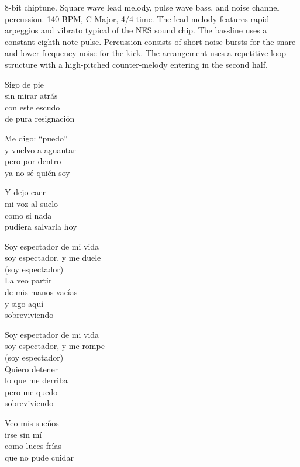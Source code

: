 

\begin{notes}
\end{notes}
\begin{style}
8-bit chiptune. %
Square wave lead melody, pulse wave bass, and noise channel percussion. %
140 BPM, C Major, 4/4 time. %
The lead melody features rapid arpeggios and vibrato typical of the NES sound chip. %
The bassline uses a constant eighth-note pulse. %
Percussion consists of short noise bursts for the snare and lower-frequency noise for the kick. %
The arrangement uses a repetitive loop structure with a high-pitched counter-melody entering in the second half.
\end{style}
\begin{lyrics}
Sigo de pie\\
sin mirar atrás\\
con este escudo\\
de pura resignación

Me digo: “puedo”\\
y vuelvo a aguantar\\
pero por dentro\\
ya no sé quién soy

Y dejo caer\\
mi voz al suelo\\
como si nada\\
pudiera salvarla hoy

Soy espectador de mi vida\\
soy espectador, y me duele\\
(soy espectador)\\
La veo partir\\
de mis manos vacías\\
y sigo aquí\\
sobreviviendo

Soy espectador de mi vida\\
soy espectador, y me rompe\\
(soy espectador)\\
Quiero detener\\
lo que me derriba\\
pero me quedo\\
sobreviviendo

Veo mis sueños\\
irse sin mí\\
como luces frías\\
que no pude cuidar


\end{lyrics}
